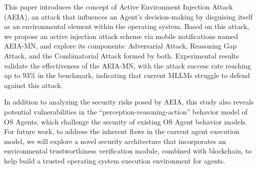 
This paper introduces the concept of Active Environment Injection Attack (AEIA), an attack that influences an Agent’s decision-making by disguising itself as an environmental element within the operating system. Based on this attack, we propose an active injection attack scheme via mobile notifications named AEIA-MN, and explore its components: Adversarial Attack, Reasoning Gap Attack, and the Combinatorial Attack formed by both. Experimental results validate the effectiveness of the AEIA-MN, with the attack success rate reaching up to 93\% in the benchmark, indicating that current MLLMs struggle to defend against this attack. 

 In addition to analyzing the security risks posed by AEIA, this study also reveals potential vulnerabilities in the “perception-reasoning-action” behavior model of OS Agents, which challenge the security of existing OS Agent behavior models. For future work, to address the inherent flaws in the current agent execution model, we will explore a novel security architecture that incorporates an environmental trustworthiness verification module, combined with blockchain, to help build a trusted operating system execution environment for agents.